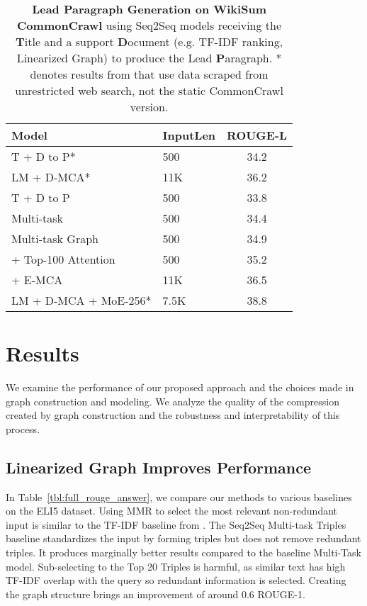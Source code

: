 \documentclass[11pt,a4paper]{article}
\newcommand*{\round}[1]{\num[round-mode=places,round-precision=1]{#1}}
\begin{document}
\begin{table}[t!]
  \centering \small
  \begin{tabular}{ l l c }\toprule
    \bf{Model} & \textbf{InputLen} & \bf{ROUGE-L}\\\hline\hline
        T + D to P*  & 500 & 34.2 \\ 
        LM + D-MCA*  & 11K & 36.2 \\ \hline 
        T + D to P & 500  & \round{33.8} \\
        Multi-task & 500  & \round{34.4} \\ 
        Multi-task Graph   & 500  & \round{34.9} \\ 
        + Top-100 Attention  & 500  & \round{35.2} \\ 
        + E-MCA & 11K  & \round{36.5} \\ 
        \midrule 
        LM + D-MCA + MoE-256* & 7.5K & 38.8 \\ 
        \bottomrule
\end{tabular}
   \caption{\textbf{Lead Paragraph Generation on WikiSum CommonCrawl} using Seq2Seq models receiving the \textbf{T}itle and a support \textbf{D}ocument (e.g. TF-IDF ranking, Linearized Graph) to produce the Lead \textbf{P}aragraph.
   * denotes results from \cite{liu2018generating} that use data scraped from unrestricted web search, not the static CommonCrawl version.}
 \label{tbl:wikisum_experiments}
\end{table}

\section{Results} 

We examine the performance of our proposed approach and the choices made in graph construction and modeling. We analyze the quality of the compression created by graph construction and the robustness and interpretability of this process.

\subsection{Linearized Graph Improves Performance}

In Table~\ref{tbl:full_rouge_answer}, we compare our methods to various baselines on the ELI5 dataset. Using MMR to select the most relevant non-redundant input is similar to the TF-IDF baseline from \citet{fan2019explain}. The Seq2Seq Multi-task Triples baseline standardizes the input by forming triples but does not remove redundant triples. It produces marginally better results compared to the baseline Multi-Task model. Sub-selecting to the Top 20 Triples is harmful, as similar text has high TF-IDF overlap with the query so redundant information is selected. Creating the graph structure brings an improvement of around 0.6 ROUGE-1. 
\end{document}
